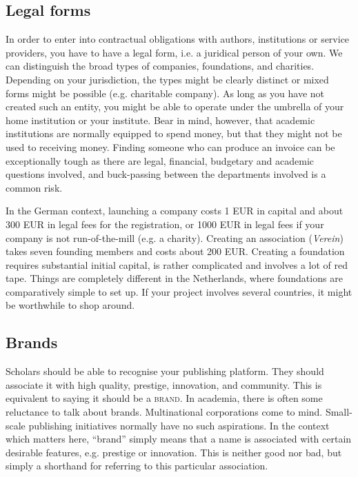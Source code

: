 \documentclass[nonflat,modfonts,output=book] {langsci/langscibook}
\begin{document}
\subsection{Legal forms}\label{sec:legalform}
In order to enter into contractual obligations with authors, institutions or service providers, you have to have a legal form, i.e. a juridical person of your own. We can distinguish the broad types of companies, foundations, and charities. Depending on your jurisdiction, the types might be clearly distinct or mixed forms might be possible (e.g. charitable company). As long as you have not created such an entity, you might be able to operate under the umbrella of your home institution or your institute. Bear in mind, however, that academic institutions are normally equipped to spend money, but that they might not be used to receiving money. Finding someone who can produce an invoice can be exceptionally tough as there are legal, financial, budgetary and academic questions involved, and buck-passing between the departments involved is a common risk. 

In the German context, launching a company costs 1 EUR in capital and about 300 EUR in legal fees for the registration, or 1000 EUR in legal fees if your company is not run-of-the-mill (e.g. a charity). Creating an association (\textit{Verein}) takes seven founding members and costs about 200 EUR. 
Creating a foundation requires substantial initial capital, is rather complicated and involves a lot of red tape. Things are completely different in the Netherlands, where foundations are comparatively simple to set up. If your project involves several countries, it might be worthwhile to shop around. 

\subsection{Brands}\label{sec:legal:brand}
Scholars should be able to recognise your publishing platform. They should associate it with high quality, prestige, innovation, and community. This is equivalent to saying it should be a \textsc{brand}. In academia, there is often some reluctance to talk about brands. Multinational corporations come to mind. Small-scale publishing initiatives normally have no such aspirations. In the context which matters here, ``brand'' simply means that a name is associated with certain desirable features, e.g. prestige or innovation. This is neither good nor bad, but simply a shorthand for referring to this particular association. 
\end{document}
